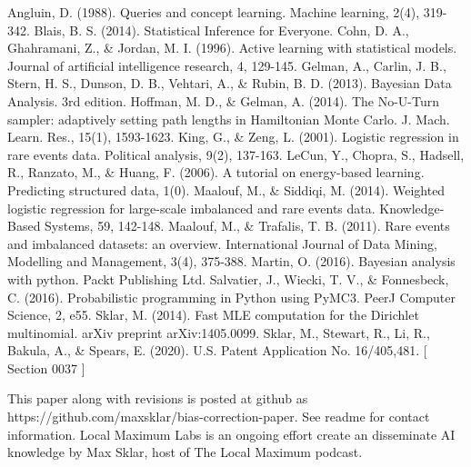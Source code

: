 \documentclass[twoside]{article}
\begin{document}
\begin{thebibliography}{20}

Angluin, D. (1988). Queries and concept learning. Machine learning, 2(4), 319-342.
Blais, B. S. (2014). Statistical Inference for Everyone.
Cohn, D. A., Ghahramani, Z., \& Jordan, M. I. (1996). Active learning with statistical models. Journal of artificial intelligence research, 4, 129-145.
Gelman, A., Carlin, J. B., Stern, H. S., Dunson, D. B., Vehtari, A., \& Rubin, B. D. (2013). Bayesian Data Analysis. 3rd edition.
Hoffman, M. D., \& Gelman, A. (2014). The No-U-Turn sampler: adaptively setting path lengths in Hamiltonian Monte Carlo. J. Mach. Learn. Res., 15(1), 1593-1623.
King, G., \& Zeng, L. (2001). Logistic regression in rare events data. Political analysis, 9(2), 137-163.
LeCun, Y., Chopra, S., Hadsell, R., Ranzato, M., \& Huang, F. (2006). A tutorial on energy-based learning. Predicting structured data, 1(0).
Maalouf, M., \& Siddiqi, M. (2014). Weighted logistic regression for large-scale imbalanced and rare events data. Knowledge-Based Systems, 59, 142-148.
Maalouf, M., \& Trafalis, T. B. (2011). Rare events and imbalanced datasets: an overview. International Journal of Data Mining, Modelling and Management, 3(4), 375-388.
Martin, O. (2016). Bayesian analysis with python. Packt Publishing Ltd.
Salvatier, J., Wiecki, T. V., \& Fonnesbeck, C. (2016). Probabilistic programming in Python using PyMC3. PeerJ Computer Science, 2, e55.
Sklar, M. (2014). Fast MLE computation for the Dirichlet multinomial. arXiv preprint arXiv:1405.0099.
Sklar, M., Stewart, R., Li, R., Bakula, A., \& Spears, E. (2020). U.S. Patent Application No. 16/405,481. [ Section 0037 ]

\end{thebibliography}

This paper along with revisions is posted at github as https://github.com/maxsklar/bias-correction-paper. See readme for contact information. Local Maximum Labs is an ongoing effort create an disseminate AI knowledge by Max Sklar, host of The Local Maximum podcast.
\end{document}
